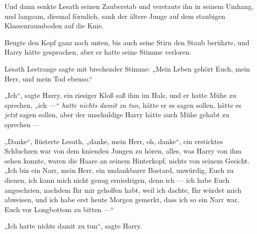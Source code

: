 Und dann senkte Lesath seinen Zauberstab und verstaute ihn in seinem Umhang, und langsam, diesmal förmlich, sank der ältere Junge auf dem staubigen Klassenraumboden auf die Knie.

Beugte den Kopf ganz nach unten, bis auch seine Stirn den Staub berührte, und Harry hätte gesprochen, aber er hatte seine Stimme verloren.

Lesath Lestrange sagte mit brechender Stimme:
„Mein Leben gehört Euch, mein Herr, und mein Tod ebenso.“

„Ich“, sagte Harry, ein riesiger Kloß saß ihm im Hals, und er hatte Mühe zu sprechen, „ich —“ \emph{hatte nichts damit zu tun}, hätte er es sagen sollen, hätte es \emph{jetzt} sagen sollen, aber der unschuldige Harry hätte auch Mühe gehabt zu sprechen —

„Danke“, flüsterte Lesath, „danke, mein Herr, oh, danke“, ein ersticktes Schluchzen war von dem knienden Jungen zu hören, alles, was Harry von ihm sehen konnte, waren die Haare an seinem Hinterkopf, nichts von seinem Gesicht.
„Ich bin ein Narr, mein Herr, ein undankbarer Bastard, unwürdig, Euch zu dienen, ich kann mich nicht genug erniedrigen, denn ich — ich habe Euch angeschrien, nachdem Ihr mir geholfen habt, weil ich dachte, Ihr würdet mich abweisen, und ich habe erst heute Morgen gemerkt, dass ich so ein Narr war, Euch vor Longbottom zu bitten —“

„Ich hatte nichts damit zu tun“, sagte Harry.

